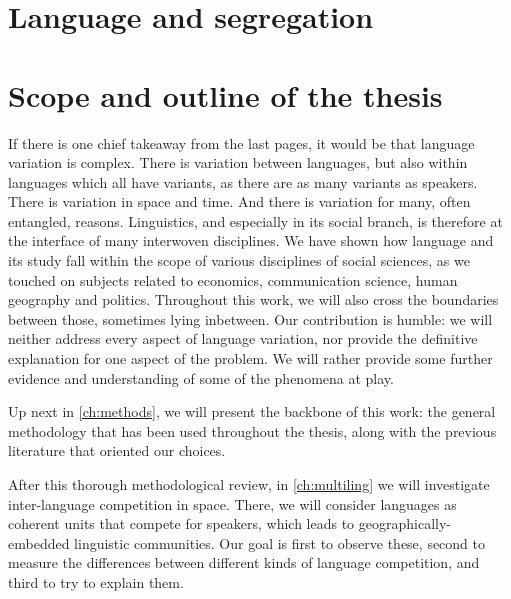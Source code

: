 \documentclass[../thesis.tex]{subfiles}
\begin{document}




\section{Language and segregation}
\cite{LamannaImmigrantCommunity2018} \cite{LevyAbitbolSocioeconomicDependencies2018}


\section{Scope and outline of the thesis}
If there is one chief takeaway from the last pages, it would be that language variation
is complex. There is variation between languages, but also within languages which all
have variants, as there are as many variants as speakers. There is variation in space
and time. And there is variation for many, often entangled, reasons. Linguistics, and
especially in its social branch, is therefore at the interface of many interwoven
disciplines. We have shown how language and its study fall within the scope of various
disciplines of social sciences, as we touched on subjects related to economics,
communication science, human geography and politics. Throughout this work, we will also
cross the boundaries between those, sometimes lying inbetween. Our contribution is
humble: we will neither address every aspect of language variation,
nor provide the definitive explanation for one aspect of the problem. We will rather
provide some further evidence and understanding of some of the phenomena at play.

Up next in \cref{ch:methods}, we will present the backbone of this work: the general
methodology that has been used throughout the thesis, along with the previous literature
that oriented our choices. 

After this thorough methodological review, in \cref{ch:multiling} we will investigate
inter-language competition in space. There, we will consider languages as coherent units
that compete for speakers, which leads to geographically-embedded linguistic
communities. Our goal is first to observe these, second to measure the differences
between different kinds of language competition, and third to try to explain them.
\end{document}
